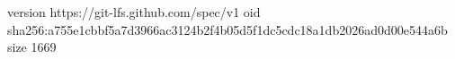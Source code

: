 version https://git-lfs.github.com/spec/v1
oid sha256:a755e1cbbf5a7d3966ac3124b2f4b05d5f1dc5cdc18a1db2026ad0d00e544a6b
size 1669
